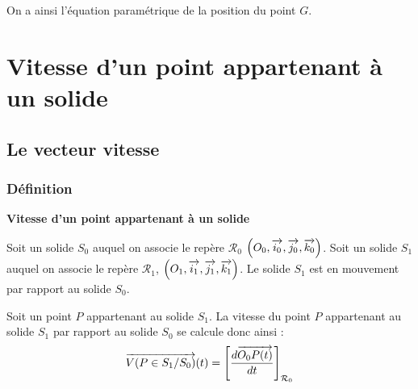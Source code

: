 \documentclass[10pt,oneside]{article}
\begin{document}
\begin{exemple}
On a ainsi l'équation paramétrique de la position du point $G$.

\vspace{.25cm}

\end{exemple}
\section{Vitesse d'un point appartenant à un solide}



\subsection{Le vecteur vitesse}
\subsubsection{Définition}

\begin{defi}
\textbf{Vitesse d'un point appartenant à un solide}

Soit un solide $S_0$ auquel on associe le repère $\mathcal{R}_0$ $\left(O_0,\overrightarrow{i_0},\overrightarrow{j_0},\overrightarrow{k_0} \right)$.  Soit un solide $S_1$ auquel on associe le repère $\mathcal{R}_1$,  $\left(O_1,\overrightarrow{i_1},\overrightarrow{j_1},\overrightarrow{k_1} \right)$. Le solide $S_1$ est en mouvement par rapport au solide $S_0$. 

Soit un point $P$ appartenant au solide $S_1$. La vitesse du point $P$ appartenant au solide $S_1$ par rapport au solide $S_0$ se calcule donc ainsi : 
$$
\overrightarrow{V(P\in S_1/S_0)}(t) = \left[\dfrac{d\overrightarrow{O_0P(t)}}{dt}\right]_{\mathcal{R}_0}
$$
\end{defi}
\end{document}
